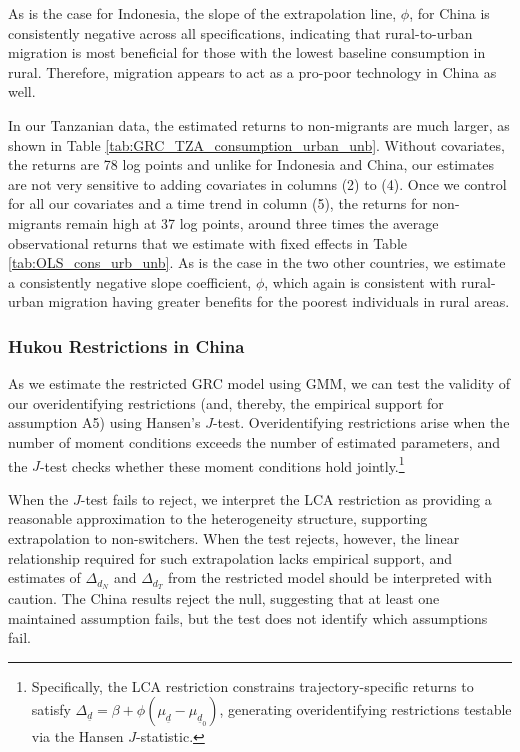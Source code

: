 As is the case for Indonesia, the slope of the extrapolation line, $\phi$, for China is consistently negative across all specifications, indicating that rural-to-urban migration is most beneficial for those with the lowest baseline consumption in rural.
Therefore, migration appears to act as a pro-poor technology in China as well.

In our Tanzanian data, the estimated returns to non-migrants are much larger, as shown in Table \ref{tab:GRC_TZA_consumption_urban_unb}. 
Without covariates, the returns are 78 log points and unlike for Indonesia and China, our estimates are not very sensitive to adding covariates in columns (2) to (4). 
Once we control for all our covariates and a time trend in column (5), the returns for non-migrants remain high at 37 log points, around three times the average observational returns that we estimate with fixed effects in Table \ref{tab:OLS_cons_urb_unb}.
As is the case in the two other countries, we estimate a consistently negative slope coefficient, $\phi$, which again is consistent with rural-urban migration having greater benefits for the poorest individuals in rural areas.

\subsubsection{Hukou Restrictions in China}\label{sec:hukou}

As we estimate the restricted GRC model using GMM, we can test the validity of our overidentifying restrictions (and, thereby, the empirical support for assumption A5) using Hansen's $J$-test. 
Overidentifying restrictions arise when the number of moment conditions exceeds the number of estimated parameters, and the $J$-test checks whether these moment conditions hold jointly.\footnote{Specifically, the LCA restriction constrains trajectory-specific returns to satisfy $\Delta_{\underline{d}} = \beta + \phi(\mu_{\underline{d}} - \mu_{\underline{d}_0})$, generating overidentifying restrictions testable via the Hansen $J$-statistic. }

When the $J$-test fails to reject, we interpret the LCA restriction as providing a reasonable approximation to the heterogeneity structure, supporting extrapolation to non-switchers. 
When the test rejects, however, the linear relationship required for such extrapolation lacks empirical support, and estimates of $\Delta_{d_N}$ and $\Delta_{d_T}$ from the restricted model should be interpreted with caution.
The China results reject the null, suggesting that at least one maintained assumption fails, but the test does not identify which assumptions fail. 

